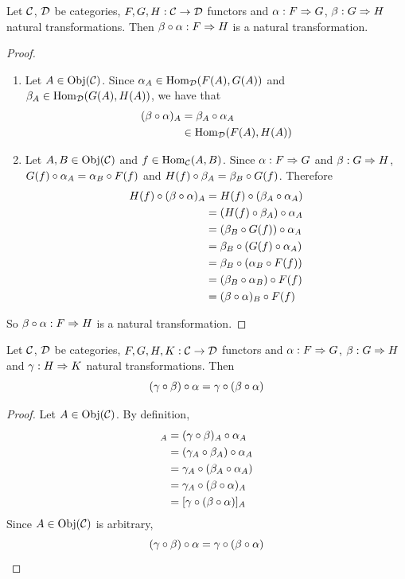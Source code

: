 \documentclass{book}
\begin{document}
	\begin{ex} 
		Let $\mathcal{C}$, $\mathcal{D}$ be categories, $F, G, H:\mathcal{C} \rightarrow \mathcal{D}$ functors and $\alpha: F \Rightarrow G$, $\beta : G \Rightarrow H$ natural transformations. Then $ \beta \circ \alpha: F \Rightarrow H$ is a natural transformation.
	\end{ex}
	
	\begin{proof}\
		\begin{enumerate}
			\item Let $A \in \operatorname{Obj}(\mathcal{C})$. Since $\alpha_A \in \operatorname{Hom}_{\mathcal{D}}(F(A), G(A))$ and $\beta_A \in \operatorname{Hom}_{\mathcal{D}}(G(A), H(A))$, we have that 
			\begin{align*}
				(\beta \circ \alpha)_A 
				& = \beta_A \circ \alpha_A \\
				& \in \operatorname{Hom}_{\mathcal{D}}(F(A), H(A))
			\end{align*}
			\item Let $A,B \in \operatorname{Obj}(\mathcal{C})$ and $f \in \operatorname{Hom}_{\mathcal{C}}(A,B)$. Since $\alpha:F \Rightarrow G$ and $\beta: G \Rightarrow H$, $G(f) \circ \alpha_A = \alpha_B \circ F(f)$ and $H(f) \circ \beta_A = \beta_B \circ G(f)$. Therefore 
			\begin{align*}
				H(f) \circ (\beta \circ \alpha)_A
				& = H(f) \circ (\beta_A \circ \alpha_A) \\
				& = (H(f) \circ \beta_A) \circ \alpha_A \\
				& = (\beta_B \circ G(f)) \circ \alpha_A \\
				& = \beta_B \circ (G(f)\circ \alpha_A) \\
				& = \beta_B \circ (\alpha_B \circ F(f)) \\
				& = (\beta_B \circ \alpha_B) \circ F(f) \\
				& = (\beta \circ \alpha)_B \circ F(f)
			\end{align*}
		\end{enumerate}
		So $\beta \circ \alpha: F \Rightarrow H$ is a natural transformation. 
	\end{proof}
	
	\begin{ex} 
		Let $\mathcal{C}$, $\mathcal{D}$ be categories, $F, G, H, K:\mathcal{C} \rightarrow \mathcal{D}$ functors and $\alpha: F \Rightarrow G$, $\beta : G \Rightarrow H$ and $\gamma: H \Rightarrow K$ natural transformations. Then $$(\gamma \circ \beta) \circ \alpha = \gamma \circ (\beta \circ \alpha)$$
	\end{ex}
	
	\begin{proof}
		Let $A \in \operatorname{Obj}(\mathcal{C})$. By definition,  
		\begin{align*}
			[(\gam \circ \be) \circ \al]_{A} 
			& = (\gam \circ \be)_A \circ \al_{A} \\
			& = (\gam_A \circ \be_A) \circ \al_A \\
			& = \gam_A \circ (\be_A \circ \al_A) \\
			& = \gam_A \circ (\be \circ \al)_A \\
			& = [\gam \circ (\be \circ \al)]_A \\
		\end{align*}
		Since $A \in \operatorname{Obj}(\mathcal{C})$ is arbitrary, 
		$$(\gamma \circ \beta) \circ \alpha = \gamma \circ (\beta \circ \alpha)$$
	\end{proof}
	
\end{document}
